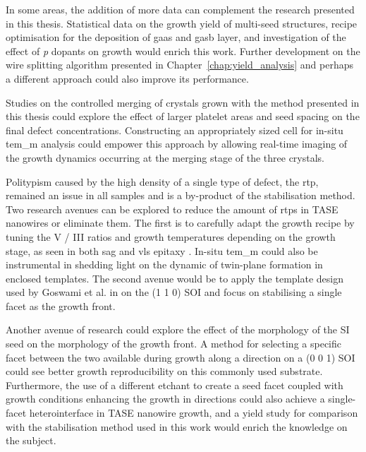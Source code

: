 In some areas, the addition of more data can complement the research presented in this thesis. Statistical data on the growth yield of multi-seed structures, recipe optimisation for the deposition of \acf{gaas} and \acf{gasb} layer, and investigation of the effect of \textit{p} dopants on growth would enrich this work. Further development on the wire splitting algorithm presented in Chapter~\ref{chap:yield_analysis} and perhaps a different approach could also improve its performance. 

Studies on the controlled merging of crystals grown with the method presented in this thesis could explore the effect of larger platelet areas and seed spacing on the final defect concentrations. Constructing an appropriately sized cell for in-situ \acf{tem_m} analysis could empower this approach by allowing real-time imaging of the growth dynamics occurring at the merging stage of the three crystals.

Politypism caused by the high density of a single type of defect, the \acf{rtp}, remained an issue in all samples and is a by-product of the  stabilisation method. Two research avenues can be explored to reduce the amount of \acs{rtp}s in \acs{TASE} nanowires or eliminate them. The first is to carefully adapt the growth recipe by tuning the V / III ratios and growth temperatures depending on the growth stage, as seen in both \acf{sag} \cite{Chi2013} and \acf{vls} epitaxy \cite{Joyce2007}. In-situ \acs{tem_m} could also be instrumental in shedding light on the dynamic of twin-plane formation in enclosed templates. The second avenue would be to apply the template design used by Goswami et al. in \cite{Goswami2020} on the \hkl(1 1 0) \acs{SOI} and focus on stabilising a single  facet as the growth front.

Another avenue of research could explore the effect of the morphology of the \acl{SI} seed on the morphology of the growth front. A method for selecting a specific  facet between the two available during growth along a  direction on a \hkl(0 0 1) \acs{SOI} could see better growth reproducibility on this commonly used substrate. Furthermore, the use of a different etchant to create a  seed facet coupled with growth conditions enhancing the growth in  directions could also achieve a single-facet heterointerface in \acs{TASE} nanowire growth, and a yield study for comparison with the  stabilisation method used in this work would enrich the knowledge on the subject.

